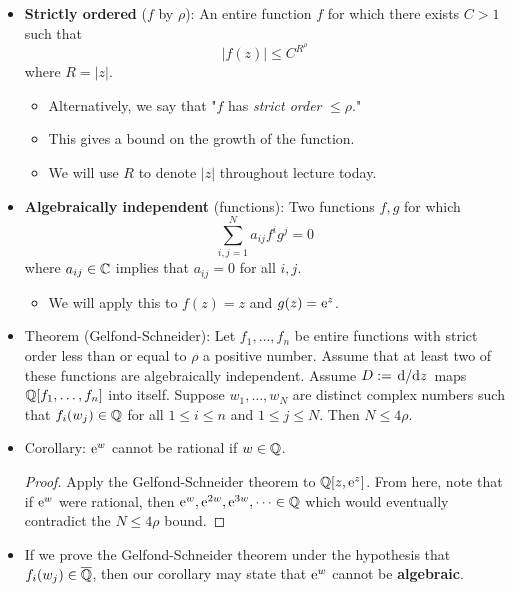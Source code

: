 \documentclass[../notes.tex]{subfiles}
\begin{document}
\begin{itemize}
\begin{proof}
        Since the above function is holomorphic, the MMP says it must obtain its maximum value on the boundary of an arbitrarily large ball around the compact set on which $f$ obtains all its zeroes. But that denominator is growing really fast, so $f$ must grow even faster to compensate.
    \end{proof}
    \item \textbf{Strictly ordered} ($f$ by $\rho$): An entire function $f$ for which there exists $C>1$ such that
    \begin{equation*}
        |f(z)| \leq C^{R^\rho}
    \end{equation*}
    where $R=|z|$.
    \begin{itemize}
        \item Alternatively, we say that "$f$ has \emph{strict order} $\leq\rho$."
        \item This gives a bound on the growth of the function.
        \item We will use $R$ to denote $|z|$ throughout lecture today.
    \end{itemize}
    \item \textbf{Algebraically independent} (functions): Two functions $f,g$ for which
    \begin{equation*}
        \sum_{i,j=1}^Na_{ij}f^ig^j = 0
    \end{equation*}
    where $a_{ij}\in\C$ implies that $a_{ij}=0$ for all $i,j$.
    \begin{itemize}
        \item We will apply this to $f(z)=z$ and $g(z)=\e[z]$.
    \end{itemize}
    \item Theorem (Gelfond-Schneider): Let $f_1,\dots,f_n$ be entire functions with strict order less than or equal to $\rho$ a positive number. Assume that at least two of these functions are algebraically independent. Assume $D:=\dv*{z}$ maps $\Q[f_1,\dots,f_n]$ into itself. Suppose $w_1,\dots,w_N$ are distinct complex numbers such that $f_i(w_j)\in\Q$ for all $1\leq i\leq n$ and $1\leq j\leq N$. Then $N\leq 4\rho$.
    \item Corollary: $\e[w]$ cannot be rational if $w\in\Q$.
    \begin{proof}
        Apply the Gelfond-Schneider theorem to $\Q[z,\e[z]]$. From here, note that if $\e[w]$ were rational, then $\e[w],\e[2w],\e[3w],\dots\in\Q$ which would eventually contradict the $N\leq 4\rho$ bound.
    \end{proof}
    \item If we prove the Gelfond-Schneider theorem under the hypothesis that $f_i(w_j)\in\overline{\Q}$, then our corollary may state that $\e[w]$ cannot be \textbf{algebraic}.

\end{itemize}
\end{document}
